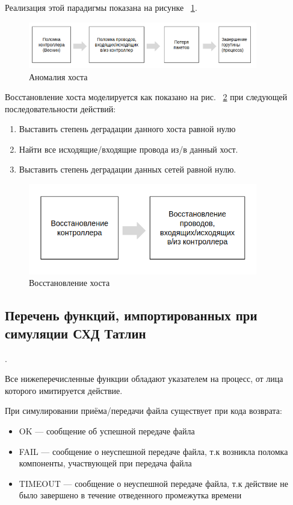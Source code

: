 Реализация этой парадигмы показана на рисунке ~\ref{fig:anom-host}.

\begin{figure}[!ht]
\centering
\includegraphics[width=10cm]{Kenenbek/images/anom-scheme-host.png}
\caption{Аномалия хоста}
\label{fig:anom-host}
\end{figure}

Восстановление хоста моделируется как показано на рис. ~\ref{fig:repai-host} при следующей последовательности действий:

\begin{enumerate}
\item Выставить степень деградации данного хоста равной нулю
\item Найти все исходящие/входящие провода из/в данный хост.
\item Выставить степень деградации данных сетей равной нулю.
\end{enumerate}

\begin{figure}[!ht]
\centering
\includegraphics[width=10cm]{Kenenbek/images/repair-host.png}
\caption{Восстановление хоста}
\label{fig:repai-host}
\end{figure}

\subsection{Перечень функций, импортированных при симуляции СХД Татлин}.

Все нижеперечисленные функции обладают указателем на процесс, от лица которого имитируется действие.

При симулировании приёма/передачи файла существует при кода возврата:
\begin{itemize}
\item OK --- сообщение об успешной передаче файла
\item FAIL --- сообщение о неуспешной передаче файла, т.к возникла поломка компоненты, участвующей при передача файла
\item TIMEOUT --- сообщение о неуспешной передаче файла, т.к действие не было завершено в течение отведенного промежутка времени
\end{itemize}  

